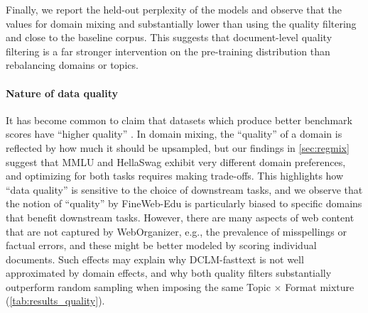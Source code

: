 Finally, we report the held-out perplexity of the models and observe that the values for domain mixing and substantially lower than using the quality filtering and close to the baseline corpus.
This suggests that document-level quality filtering is a far stronger intervention on the pre-training distribution than rebalancing domains or topics.

\paragraph{Nature of data quality}
It has become common 
to claim that datasets which produce better benchmark scores have ``higher quality'' \citep{li2023textbooks, wettig2024qurating, sachdeva2024train, penedo2024finewebdatasetsdecantingweb, li2024datacomplm}.
In domain mixing, the ``quality'' of a domain is reflected by how much it should be upsampled, but our findings in \autoref{sec:regmix} suggest that MMLU and HellaSwag exhibit very different domain preferences,
and optimizing for both tasks requires making trade-offs.
This highlights how ``data quality'' is sensitive to the choice of downstream tasks, %
and we observe that the notion of ``quality'' by FineWeb-Edu is particularly biased to specific domains that benefit downstream tasks.
However, there are many aspects of web content that are not captured by \mbox{WebOrganizer}, e.g., the prevalence of misspellings or factual errors, and these might be better modeled by scoring individual documents.
Such effects may explain why DCLM-fasttext is not well approximated by domain effects, 
and why both quality filters substantially outperform random sampling when imposing the same Topic $\times$ Format mixture (\autoref{tab:results_quality}).



